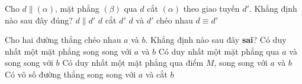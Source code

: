 \begin{ex}%
	Cho $ d\parallel ( \alpha)$, mặt phẳng $( \beta)$ qua $ d$ cắt $(  \alpha)$ theo giao tuyến $d'$. Khẳng định nào sau đây đúng?
	 \choice
		{\True  $ d\parallel d' $}
		{$  d$ cắt $d'$}
		{$ d$  và $d'$ chéo nhau}
		 {$ d\equiv d' $}
\end{ex}

\begin{ex}%
	Cho hai đường thẳng chéo nhau  $ a$ và $ b$. Khẳng định nào sau đây \textbf{sai}?
	 \choice
		{\True Có duy nhất một mặt phẳng song song với $ a$ và  $ b $}
		{Có duy nhất một mặt phẳng qua $ a$ và song song  với $ b $}
		{Có duy nhất một mặt phẳng qua điểm $M$, song song  với $ a$ và $ b$}
		{Có vô số đường thẳng song song với $ a$ và  cắt $ b $}
\end{ex}

